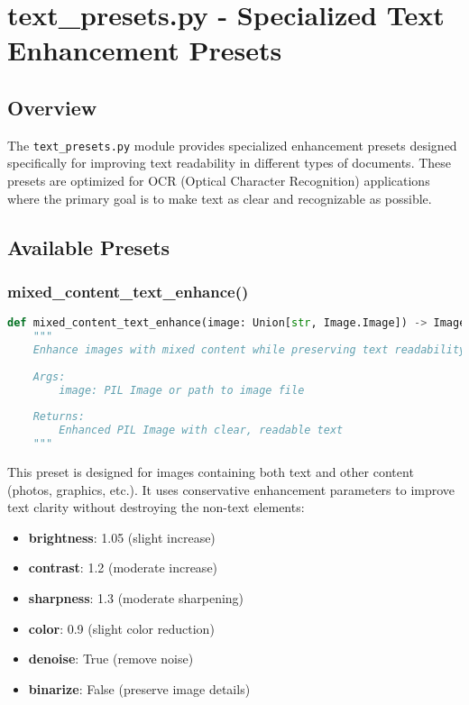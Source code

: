 \section{text\_presets.py - Specialized Text Enhancement Presets}

\subsection{Overview}
The \texttt{text\_presets.py} module provides specialized enhancement presets designed specifically for improving text readability in different types of documents. These presets are optimized for OCR (Optical Character Recognition) applications where the primary goal is to make text as clear and recognizable as possible.

\subsection{Available Presets}

\subsubsection{mixed\_content\_text\_enhance()}
\begin{lstlisting}[language=Python, caption=Mixed Content Enhancement Function]
def mixed_content_text_enhance(image: Union[str, Image.Image]) -> Image.Image:
    """
    Enhance images with mixed content while preserving text readability
    
    Args:
        image: PIL Image or path to image file
        
    Returns:
        Enhanced PIL Image with clear, readable text
    """
\end{lstlisting}

This preset is designed for images containing both text and other content (photos, graphics, etc.). It uses conservative enhancement parameters to improve text clarity without destroying the non-text elements:

\begin{itemize}
    \item \textbf{brightness}: 1.05 (slight increase)
    \item \textbf{contrast}: 1.2 (moderate increase)
    \item \textbf{sharpness}: 1.3 (moderate sharpening)
    \item \textbf{color}: 0.9 (slight color reduction)
    \item \textbf{denoise}: True (remove noise)
    \item \textbf{binarize}: False (preserve image details)
\end{itemize}

